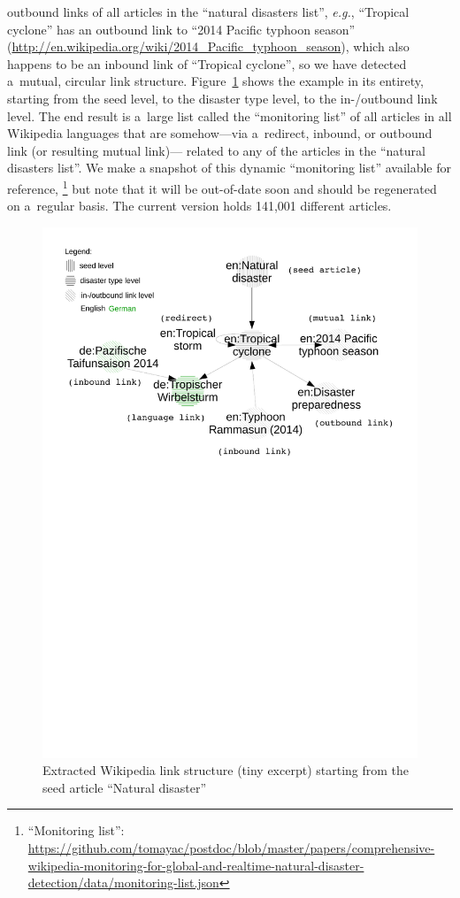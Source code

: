\documentclass[letterpaper]{article}
\begin{document}
outbound links of all articles in the ``natural disasters list'',
\emph{e.g.}, ``Tropical cyclone'' has an outbound link to
``2014 Pacific typhoon season''
(\url{http://en.wikipedia.org/wiki/2014_Pacific_typhoon_season}),
which also happens to be an inbound link of ``Tropical cyclone'',
so we have detected a~mutual, circular link structure.
Figure~\ref{fig:link-structure} shows the example in its entirety,
starting from the seed level, to the disaster type level, to the in-/outbound link level.
The end result is a~large list called the ``monitoring list''
of all articles in all Wikipedia languages
that are somehow---via a~redirect, inbound, or outbound link (or resulting mutual link)---%
related to any of the articles
in the ``natural disasters list''.
We make a snapshot of this dynamic ``monitoring list'' available for reference,%
\footnote{``Monitoring list'':
\url{https://github.com/tomayac/postdoc/blob/master/papers/comprehensive-wikipedia-monitoring-for-global-and-realtime-natural-disaster-detection/data/monitoring-list.json}}
but note that it will be out-of-date soon and should be regenerated
on a~regular basis.
The current version holds 141,001 different articles.

\begin{figure}[hbt]
  \centering
  \includegraphics[width=0.78\linewidth]{link-structure}
  \caption{Extracted Wikipedia link structure (tiny excerpt) starting from the seed article ``Natural disaster''}
  \label{fig:link-structure}
\end{figure}
\end{document}
